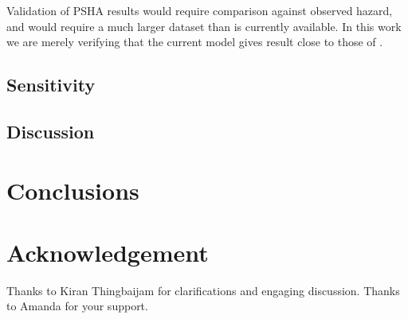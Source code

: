 \documentclass{article}
\begin{document}
Validation of PSHA results would require comparison against observed hazard, and would require a much larger dataset than is currently available.
In this work we are merely verifying that the current model gives result close to those of \cite{nath2012probabilistic}.

\subsection{Sensitivity}
\label{subsec:Sensitivity}

\subsection{Discussion}
\label{subsec:Discussion}

\section{Conclusions}
\label{sec:Conclusions}

\section*{Acknowledgement}
Thanks to Kiran Thingbaijam for clarifications and engaging discussion.
Thanks to Amanda for your support.

\cleardoublepage
{}
{}


\end{document}
